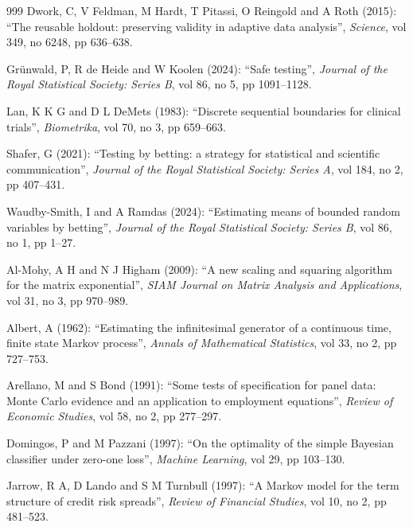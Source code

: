 \begin{thebibliography}{999}
Dwork, C, V Feldman, M Hardt, T Pitassi, O Reingold and A Roth (2015): ``The reusable holdout: preserving validity in adaptive data analysis'', \emph{Science}, vol 349, no 6248, pp 636--638.

Gr\"unwald, P, R de Heide and W Koolen (2024): ``Safe testing'', \emph{Journal of the Royal Statistical Society: Series B}, vol 86, no 5, pp 1091--1128.

Lan, K K G and D L DeMets (1983): ``Discrete sequential boundaries for clinical trials'', \emph{Biometrika}, vol 70, no 3, pp 659--663.

Shafer, G (2021): ``Testing by betting: a strategy for statistical and scientific communication'', \emph{Journal of the Royal Statistical Society: Series A}, vol 184, no 2, pp 407--431.

Waudby-Smith, I and A Ramdas (2024): ``Estimating means of bounded random variables by betting'', \emph{Journal of the Royal Statistical Society: Series B}, vol 86, no 1, pp 1--27.

Al-Mohy, A H and N J Higham (2009): ``A new scaling and squaring algorithm for the matrix exponential'', \emph{SIAM Journal on Matrix Analysis and Applications}, vol 31, no 3, pp 970--989.

Albert, A (1962): ``Estimating the infinitesimal generator of a continuous time, finite state Markov process'', \emph{Annals of Mathematical Statistics}, vol 33, no 2, pp 727--753.

Arellano, M and S Bond (1991): ``Some tests of specification for panel data: Monte Carlo evidence and an application to employment equations'', \emph{Review of Economic Studies}, vol 58, no 2, pp 277--297.

Domingos, P and M Pazzani (1997): ``On the optimality of the simple Bayesian classifier under zero-one loss'', \emph{Machine Learning}, vol 29, pp 103--130.

Jarrow, R A, D Lando and S M Turnbull (1997): ``A Markov model for the term structure of credit risk spreads'', \emph{Review of Financial Studies}, vol 10, no 2, pp 481--523.


\end{thebibliography}
